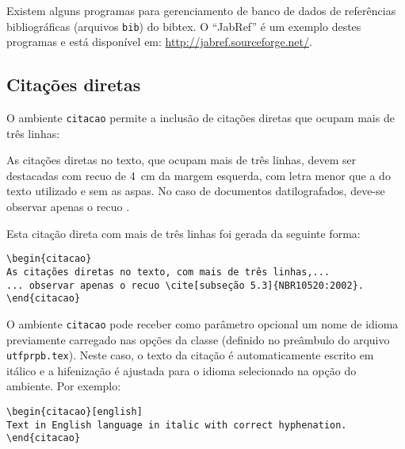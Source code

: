 Existem alguns programas para gerenciamento de banco de dados de referências bibliográficas (arquivos \texttt{bib}) do \gls{bibtex}. O ``JabRef'' é um exemplo destes programas e está disponível em: \url{http://jabref.sourceforge.net/}.

\subsection{Citações diretas}\label{sec:citacoesdiretas}

O ambiente \texttt{citacao} permite a inclusão de citações diretas que ocupam mais de três linhas:

\begin{citacao}%
As citações diretas no texto, que ocupam mais de três linhas, devem ser destacadas com recuo de \SI{4}{cm} da margem esquerda, com letra menor que a do texto utilizado e sem as aspas. No caso de documentos datilografados, deve-se observar apenas o recuo \cite[subseção 5.3]{NBR10520:2002}.
\end{citacao}

\noindent Esta citação direta com mais de três linhas foi gerada da seguinte forma:

\begin{SingleSpacing}%
\begin{verbatim}
\begin{citacao}
As citações diretas no texto, com mais de três linhas,...
... observar apenas o recuo \cite[subseção 5.3]{NBR10520:2002}.
\end{citacao}
\end{verbatim}
\end{SingleSpacing}

O ambiente \texttt{citacao} pode receber como parâmetro opcional um nome de idioma previamente carregado nas opções da classe (definido no preâmbulo do arquivo \texttt{utfprpb.tex}). Neste caso, o texto da citação é automaticamente escrito em itálico e a hifenização é ajustada para o idioma selecionado na opção do ambiente. Por exemplo:

\begin{SingleSpacing}%
\begin{verbatim}
\begin{citacao}[english]
Text in English language in italic with correct hyphenation.
\end{citacao}
\end{verbatim}
\end{SingleSpacing}


